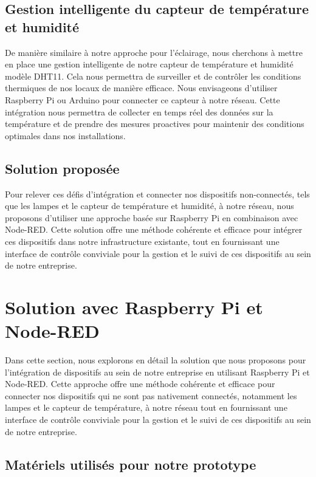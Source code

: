 \subsection{Gestion intelligente du capteur de température et humidité}

De manière similaire à notre approche pour l'éclairage, nous cherchons à mettre en place une gestion intelligente de notre capteur de température et humidité modèle DHT11. Cela nous permettra de surveiller et de contrôler les conditions thermiques de nos locaux de manière efficace. Nous envisageons d'utiliser Raspberry Pi ou Arduino pour connecter ce capteur à notre réseau. Cette intégration nous permettra de collecter en temps réel des données sur la température et de prendre des mesures proactives pour maintenir des conditions optimales dans nos installations.


\subsection{Solution proposée}

Pour relever ces défis d'intégration et connecter nos dispositifs non-connectés, tels que les lampes et le capteur de température et humidité, à notre réseau, nous proposons d'utiliser une approche basée sur Raspberry Pi en combinaison avec Node-RED. Cette solution offre une méthode cohérente et efficace pour intégrer ces dispositifs dans notre infrastructure existante, tout en fournissant une interface de contrôle conviviale pour la gestion et le suivi de ces dispositifs au sein de notre entreprise.




\section{Solution avec Raspberry Pi et Node-RED}

Dans cette section, nous explorons en détail la solution que nous proposons pour l'intégration de dispositifs au sein de notre entreprise en utilisant Raspberry Pi et Node-RED. Cette approche offre une méthode cohérente et efficace pour connecter nos dispositifs qui ne sont pas nativement connectés, notamment les lampes et le capteur de température, à notre réseau tout en fournissant une interface de contrôle conviviale pour la gestion et le suivi de ces dispositifs au sein de notre entreprise.



\subsection{Matériels utilisés pour notre prototype}

